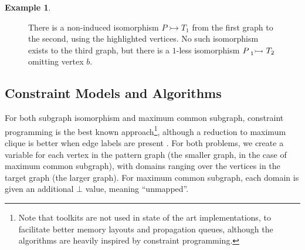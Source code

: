 \documentclass[letterpaper]{article}
\newcommand{\citep}[1]{\cite{#1}}
\theoremstyle{definition}
\newtheorem{example}{Example}
\newcommand{\lessnonind}[1]{\prescript{}{#1}{\rightarrowtail}\ }
\begin{document}
\begin{example}
\begin{figure}
\hspace{0.5cm}
    \caption{There is a non-induced isomorphism $P\rightarrowtail T_{1}$ from the first graph to the
    second, using the highlighted vertices. No such isomorphism exists to the third graph, but there
    is a $1$-less isomorphism $P\lessnonind{1} T_{2}$ omitting vertex $b$.}\label{fig:klessexample}
\end{figure}
\end{example}

\subsection{Constraint Models and Algorithms}

For both subgraph isomorphism and maximum common subgraph, constraint programming is the best known
approach\footnote{Note that toolkits are not used in state of the art implementations, to facilitate
better memory layouts and propagation queues, although the algorithms are heavily inspired by
constraint programming.}, although a reduction to maximum clique is better when edge labels are
present \citep{DBLP:conf/cp/NdiayeS11,DBLP:conf/cp/McCreeshNPS16}. For both problems, we create a variable for each vertex
in the pattern graph (the smaller graph, in the case of maximum common subgraph), with domains
ranging over the vertices in the target graph (the larger graph). For maximum common subgraph, each
domain is given an additional $\bot$ value, meaning ``unmapped''.
\end{document}
